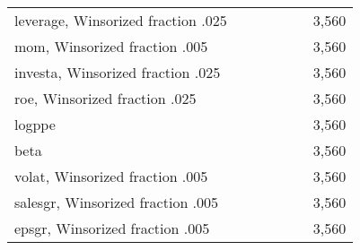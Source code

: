 {\begin{tabular}{l*{1}{cccccc}}
leverage, Winsorized fraction .025&            &            &            &            &            &       3,560\\
mom, Winsorized fraction .005&            &            &            &            &            &       3,560\\
investa, Winsorized fraction .025&            &            &            &            &            &       3,560\\
roe, Winsorized fraction .025&            &            &            &            &            &       3,560\\
logppe              &            &            &            &            &            &       3,560\\
beta                &            &            &            &            &            &       3,560\\
volat, Winsorized fraction .005&            &            &            &            &            &       3,560\\
salesgr, Winsorized fraction .005&            &            &            &            &            &       3,560\\
epsgr, Winsorized fraction .005&            &            &            &            &            &       3,560\\
\bottomrule
\end{tabular}
}
